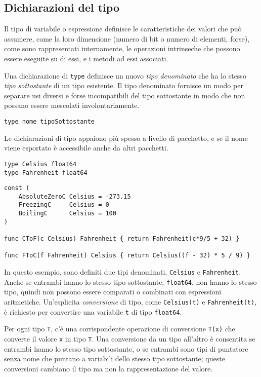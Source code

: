 \documentclass[../../thesis.tex]{subfiles}
\begin{document}
    \subsection{Dichiarazioni del tipo}\label{subsec:dichiarazioni-del-tipo}
    Il tipo di variabile o espressione definisce le caratteristiche dei valori che può assumere, come la loro dimensione (numero di bit o numero di elementi, forse), come sono rappresentati internamente, le operazioni intrinseche che possono essere eseguite su di essi, e i metodi ad essi associati.
    \hfill \vspace{12pt}

    Una dichiarazione di \verb"type" definisce un nuovo \textit{tipo denominato} che ha lo stesso \textit{tipo sottostante} di un tipo esistente.
    Il tipo denominato fornisce un modo per separare usi diversi e forse incompatibili del tipo sottostante in modo che non possano essere mescolati involontariamente.
    \begin{lstlisting}[label = {lst:lstlisting1-5.1}]
type nome tipoSottostante
    \end{lstlisting}
    Le dichiarazioni di tipo appaiono più spesso a livello di pacchetto, e se il nome viene esportato è accessibile anche da altri pacchetti.
    \begin{lstlisting}[frame = single, label = {lst:lstlisting1-5.2}]
type Celsius float64
type Fahrenheit float64
    \end{lstlisting}
    \begin{lstlisting}[frame = single, label = {lst:lstlisting1-5.3}]
const (
    AbsoluteZeroC Celsius = -273.15
    FreezingC	  Celsius = 0
    BoilingC	  Celsius = 100
)

func CToF(c Celsius) Fahrenheit { return Fahrenheit(c*9/5 + 32) }

func FToC(f Fahrenheit) Celsius { return Celsius((f - 32) * 5 / 9) }
    \end{lstlisting}
    In questo esempio, sono definiti due tipi denominati, \verb"Celsius" e \verb"Fahrenheit".
    Anche se entrambi hanno lo stesso tipo sottostante, \verb"float64", non hanno lo stesso tipo, quindi non possono essere comparati o combinati con espressioni aritmetiche.
    Un'esplicita \textit{conversione} di tipo, come \verb"Celsius(t)" e \verb"Fahrenheit(t)", è richiesto per convertire una variabile \verb"t" di tipo \verb"float64".
    \hfill \vspace{12pt}

    Per ogni tipo \verb"T", c'è una corrispondente operazione di conversione \verb"T(x)" che converte il valore \verb"x" in tipo \verb"T".
    Una conversione da un tipo all'altro è consentita se entrambi hanno lo stesso tipo sottostante, o se entrambi sono tipi di puntatore senza nome che puntano a variabili dello stesso tipo sottostante;
    queste conversioni cambiano il tipo ma non la rappresentazione del valore.
    \hfill \vspace{12pt}
\end{document}
